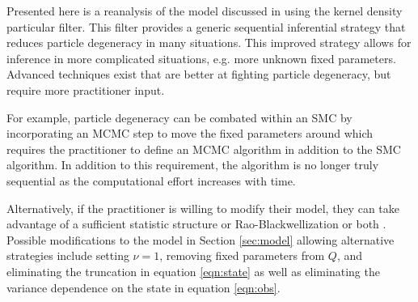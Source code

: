 
Presented here is a reanalysis of the model discussed in \citet{skvortsov2012monitoring} using the kernel density particular filter. This filter provides a generic sequential inferential strategy that reduces particle degeneracy in many situations. This improved strategy allows for inference in more complicated situations, e.g. more unknown fixed parameters. Advanced techniques exist that are better at fighting particle degeneracy, but require more practitioner input. 

For example, particle degeneracy can be combated within an SMC by incorporating an MCMC step to move the fixed parameters around \citep{Gilk:Berz:foll:2001,Stor:part:2002} which requires the practitioner to define an MCMC algorithm in addition to the SMC algorithm. In addition to this requirement, the algorithm is no longer truly sequential as the computational effort increases with time. 

Alternatively, if the practitioner is willing to modify their model, they can take advantage of a sufficient statistic structure \citep{Fear:mark:2002} or Rao-Blackwellization \citep{Douc:Gods:Andr:on:2000} or both \citep{carvalho2010particle}. Possible modifications to the model in Section \ref{sec:model} allowing alternative strategies include setting $\nu=1$, removing fixed parameters from $Q$, and eliminating the truncation in equation \eqref{eqn:state} as well as eliminating the variance dependence on the state in equation \eqref{eqn:obs}. 


